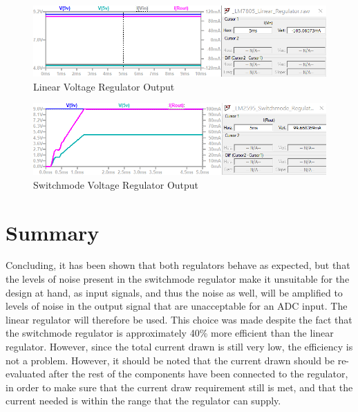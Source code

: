 \begin{figure}[h]
    \centering
    \includegraphics[width = 1\textwidth]{Figures/lmout.png}
    \caption{Linear Voltage Regulator Output}
    \label{fig:lmout}
\end{figure}

\begin{figure}[h]
    \centering
    \includegraphics[width = 1\textwidth]{Figures/smout.png}
    \caption{Switchmode Voltage Regulator Output}
    \label{fig:smout}
\end{figure}

\section{Summary}\label{sec:temp_summary}
Concluding, it has been shown that both regulators behave as expected, but that the levels of noise present in the switchmode regulator make it unsuitable for the design at hand, as input signals, and thus the noise as well, will be amplified to levels of noise in the output signal that are unacceptable for an ADC input. The linear regulator will therefore be used. This choice was made despite the fact that the switchmode regulator is approximately 40\% more efficient than the linear regulator. However, since the total current drawn is still very low, the efficiency is not a problem. However, it should be noted that the current drawn should be re-evaluated after the rest of the components have been connected to the regulator, in order to make sure that the current draw requirement still is met, and that the current needed is within the range that the regulator can supply.
